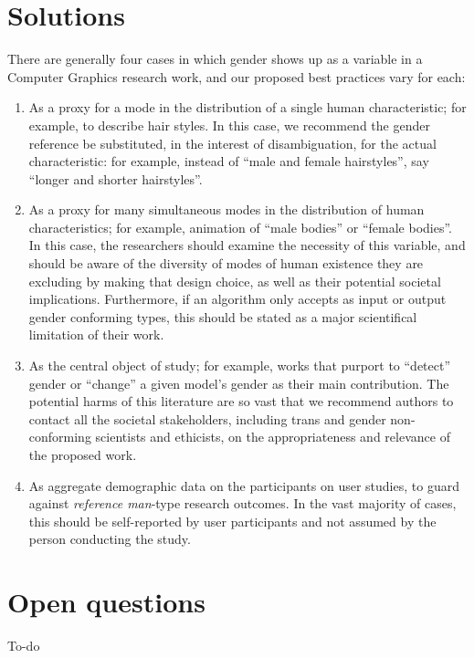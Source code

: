 \documentclass[acmtog,nonacm,review,balance=false]{acmart}
\begin{document}
\section{Solutions}

There are generally four cases in which gender shows up as a variable in a
Computer Graphics research work, and our proposed best practices vary for each:

\begin{enumerate}
  \item As a proxy for a mode in the distribution of a single human
    characteristic; for example, to describe hair styles. In this case, we
    recommend the gender reference be substituted, in the interest of
    disambiguation, for the actual characteristic: for example, instead of
    ``male and female hairstyles'', say ``longer and shorter hairstyles''.
  \item As a proxy for many simultaneous modes in the distribution of human
    characteristics; for example, animation of ``male bodies'' or ``female
    bodies''. In this case, the researchers should examine the necessity of this
    variable, and should be aware of the diversity of modes of human existence
    they are excluding by making that design choice, as well as their potential
    societal implications. Furthermore, if an algorithm only accepts as input or
    output gender conforming types, this should be stated as a major
    scientifical limitation of their work.
  \item As the central object of study; for example, works that purport to
    ``detect'' gender or ``change'' a given model's gender as their main
    contribution. The potential harms of this literature are so vast that we
    recommend authors to contact all the societal stakeholders, including trans
    and gender non-conforming scientists and ethicists, on the appropriateness
    and relevance of the proposed work. 
  \item As aggregate demographic data on the participants on user studies, to guard
    against \emph{reference man}-type research outcomes. In the vast majority of
    cases, this should be self-reported by user participants and not assumed by
    the person conducting the study.
\end{enumerate}

\section{Open questions}

To-do



\end{document}
